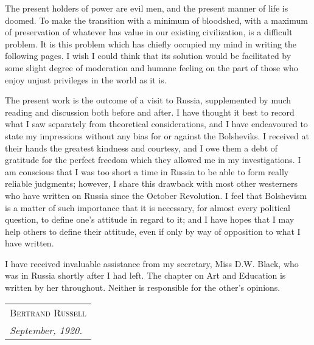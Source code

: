 The present holders of power are evil men, and the present manner of life is doomed. To make the transition with a minimum of bloodshed, with a maximum of preservation of whatever has value in our existing civilization, is a difficult problem. It is this problem which has chiefly occupied my mind in writing the following pages. I wish I could think that its solution would be facilitated by some slight degree of moderation and humane feeling on the part of those who enjoy unjust privileges in the world as it is.

The present work is the outcome of a visit to Russia, supplemented by much reading and discussion both before and after. I have thought it best to record what I saw separately from theoretical considerations, and I have endeavoured to state my impressions without any bias for or against the Bolsheviks. I received at their hands the greatest kindness and courtesy, and I owe them a debt of gratitude for the perfect freedom which they allowed me in my investigations. I am conscious that I was too short a time in Russia to be able to form really reliable judgments; however, I share this drawback with most other westerners who have written on Russia since the October Revolution. I feel that Bolshevism is a matter of such importance that it is necessary, for almost every political question, to define one's attitude in regard to it; and I have hopes that I may help others to define their attitude, even if only by way of opposition to what I have written.

I have received invaluable assistance from my secretary, Miss D.W. Black, who was in Russia shortly after I had left. The chapter on Art and Education is written by her throughout. Neither is responsible for the other's opinions.

\hfill
\begin{tabular}{@{}l@{}}
\scshape Bertrand Russell\\
\emph{September, 1920.}
\end{tabular}